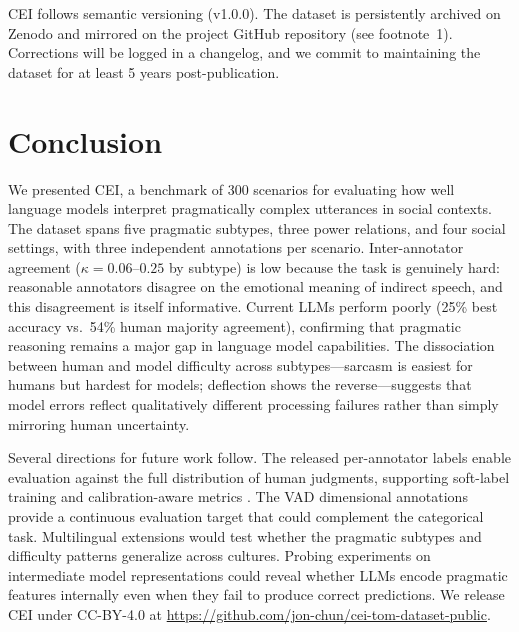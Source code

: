 \documentclass[twoside,11pt]{article}
\begin{document}
CEI follows semantic versioning (v1.0.0). The dataset is persistently archived on Zenodo \citep{chun2026cei} and mirrored on the project GitHub repository (see footnote~1). Corrections will be logged in a changelog, and we commit to maintaining the dataset for at least 5 years post-publication.

\section{Conclusion}
\label{sec:conclusion}

We presented CEI, a benchmark of 300 scenarios for evaluating how well language models interpret pragmatically complex utterances in social contexts. The dataset spans five pragmatic subtypes, three power relations, and four social settings, with three independent annotations per scenario. Inter-annotator agreement ($\kappa = 0.06$--$0.25$ by subtype) is low because the task is genuinely hard: reasonable annotators disagree on the emotional meaning of indirect speech, and this disagreement is itself informative. Current LLMs perform poorly (25\% best accuracy vs.\ 54\% human majority agreement), confirming that pragmatic reasoning remains a major gap in language model capabilities. The dissociation between human and model difficulty across subtypes---sarcasm is easiest for humans but hardest for models; deflection shows the reverse---suggests that model errors reflect qualitatively different processing failures rather than simply mirroring human uncertainty.

Several directions for future work follow. The released per-annotator labels enable evaluation against the full distribution of human judgments, supporting soft-label training and calibration-aware metrics \citep{uma2021learning}. The VAD dimensional annotations provide a continuous evaluation target that could complement the categorical task. Multilingual extensions would test whether the pragmatic subtypes and difficulty patterns generalize across cultures. Probing experiments on intermediate model representations could reveal whether LLMs encode pragmatic features internally even when they fail to produce correct predictions. We release CEI under CC-BY-4.0 at \url{https://github.com/jon-chun/cei-tom-dataset-public}.
\end{document}
